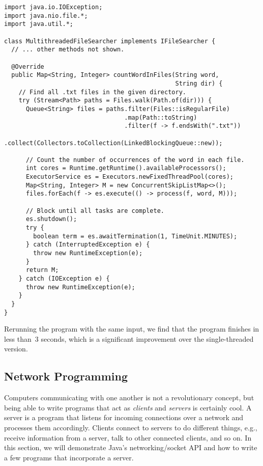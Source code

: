 \enlargethispage{-1\baselineskip}
\begin{lstlisting}[language=MyJava]
import java.io.IOException;
import java.nio.file.*;
import java.util.*;

class MultithreadedFileSearcher implements IFileSearcher {
  // ... other methods not shown.

  @Override
  public Map<String, Integer> countWordInFiles(String word,
                                               String dir) {
    // Find all .txt files in the given directory.
    try (Stream<Path> paths = Files.walk(Path.of(dir))) {
      Queue<String> files = paths.filter(Files::isRegularFile)
                                 .map(Path::toString)
                                 .filter(f -> f.endsWith(".txt"))
                                 .collect(Collectors.toCollection(LinkedBlockingQueue::new));

      // Count the number of occurrences of the word in each file.
      int cores = Runtime.getRuntime().availableProcessors();
      ExecutorService es = Executors.newFixedThreadPool(cores);
      Map<String, Integer> M = new ConcurrentSkipListMap<>();
      files.forEach(f -> es.execute(() -> process(f, word, M)));
      
      // Block until all tasks are complete.
      es.shutdown();
      try {
        boolean term = es.awaitTermination(1, TimeUnit.MINUTES);
      } catch (InterruptedException e) {
        throw new RuntimeException(e);
      }
      return M;
    } catch (IOException e) {
      throw new RuntimeException(e);
    }
  }
}
\end{lstlisting}

Rerunning the program with the same input, we find that the program finishes in less than~$3$ seconds, which is a significant improvement over the single-threaded version.

\subsection{Network Programming}

Computers communicating with one another is not a revolutionary concept, but being able to write programs that act as \emph{clients} and \emph{servers} is certainly cool. 
A server is a program that listens for incoming connections over a network and processes them accordingly. 
Clients connect to servers to do different things, e.g., receive information from a server, talk to other connected clients, and so on. 
In this section, we will demonstrate Java's networking/socket API and how to write a few programs that incorporate a server.

